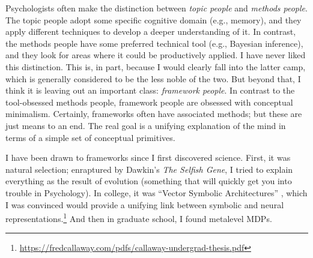 


Psychologists often make the distinction between \emph{topic people} and \emph{methods people}. The topic people adopt some specific cognitive domain (e.g., memory), and they apply different techniques to develop a deeper understanding of it. In contrast, the methods people have some preferred technical tool (e.g., Bayesian inference), and they look for areas where it could be productively applied. I have never liked this distinction. This is, in part, because I would clearly fall into the latter camp, which is generally considered to be the less noble of the two. But beyond that, I think it is leaving out an important class: \emph{framework people}. In contrast to the tool-obsessed methods people, framework people are obsessed with conceptual minimalism. Certainly, frameworks often have associated methods; but these are just means to an end. The real goal is a unifying explanation of the mind in terms of a simple set of conceptual primitives.

I have been drawn to frameworks since I first discovered science. First, it was natural selection; enraptured by Dawkin's \emph{The Selfish Gene}, I tried to explain everything as the result of evolution (something that will quickly get you into trouble in Psychology). In college, it was ``Vector Symbolic Architectures'' \citep{kanerva1988sparse,plate1995holographic}, which I was convinced would provide a unifying link between symbolic and neural representations.\footnote{%
  \url{https://fredcallaway.com/pdfs/callaway-undergrad-thesis.pdf}
} And then in graduate school, I found metalevel MDPs.

